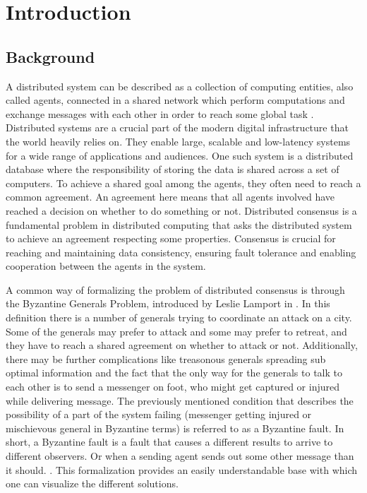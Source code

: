 \section{Introduction}
\thispagestyle{empty}

\subsection{Background}
A distributed system can be described as a collection of computing entities, also called agents, connected in a shared network which perform computations and exchange messages with each other in order to reach some global task \cite{Coulouris_systems_2005}. Distributed systems are a crucial part of the modern digital infrastructure that the world heavily relies on. They enable large, scalable and low-latency systems for a wide range of applications and audiences. One such system is a distributed database where the responsibility of storing the data is shared across a set of computers. To achieve a shared goal among the agents, they often need to reach a common agreement. An agreement here means that all agents involved have reached a decision on whether to do something or not. Distributed consensus is a fundamental problem in distributed computing that asks the distributed system to achieve an agreement respecting some properties. Consensus is crucial for reaching and maintaining data consistency, ensuring fault tolerance and enabling cooperation between the agents in the system. \cite{Lynch_distributed_2017}

A common way of formalizing the problem of distributed consensus is through the Byzantine Generals Problem, introduced by Leslie Lamport in \cite{lamportByzantineGeneralsProblem}. In this definition there is a number of generals trying to coordinate an attack on a city. Some of the generals may prefer to attack and some may prefer to retreat, and they have to reach a shared agreement on whether to attack or not. Additionally, there may be further complications like treasonous generals spreading sub optimal information and the fact that the only way for the generals to talk to each other is to send a messenger on foot, who might get captured or injured while delivering message. 
The previously mentioned condition that describes the possibility of a part of the system failing (messenger getting injured or mischievous general in Byzantine terms) is referred to as a Byzantine fault. In short, a Byzantine fault is a fault that causes a different results to arrive to different observers. Or when a sending agent sends out some other message than it should. \cite{driscollRealByzantineGenerals2004}. 
This formalization provides an easily understandable base with which one can visualize the different solutions.

